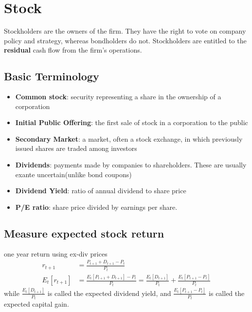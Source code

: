 \documentclass{article}
\theoremstyle{definition}
\theoremstyle{thrm}
\theoremstyle{lma}
\theoremstyle{ppst}
\theoremstyle{crlr}
\begin{document}
\section{Stock}
Stockholders are the owners of the firm. They have the right to vote on company policy and strategy, whereas bondholders do not. Stockholders are entitled to the \textbf{residual} cash flow from the firm's operations. 
\subsection{Basic Terminology}
\begin{itemize}
	\item \textbf{Common stock}: security representing a share in the ownership of a corporation
	\item \textbf{Initial Public Offering}: the first sale of stock in a corporation to the public
	\item \textbf{Secondary Market}: a market, often a stock exchange, in which previously issued shares are traded among investors
	\item \textbf{Dividends}: payments made by companies to shareholders. These are usually exante uncertain(unlike bond coupons)
	\item \textbf{Dividend Yield}: ratio of annual dividend to share price
	\item \textbf{P/E ratio}: share price divided by earnings per share.
\end{itemize}

\subsection{Measure expected stock return}
one year return using ex-div prices
\begin{align*}
	r_{t+1} &= \frac{P_{t+1}+D_{t+1}-P_t}{P_t}\\
	E_t[r_{t+1}] &= \frac{E_t[P_{t+1}+D_{t+1}]-P_t}{P_t} = \frac{E_t[D_{t+1}]}{P_t}+\frac{E_t[P_{t+1}-P_t]}{P_t}
\end{align*}
while $\frac{E_t[D_{t+1}]}{P_t}$ is called the expected dividend yield, and $\frac{E_t[P_{t+1}-P_t]}{P_t}$ is called the expected capital gain.
\end{document}

